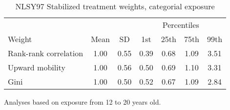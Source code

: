 \begin{table}[htp]
\centering
\footnotesize
\setlength{\tabcolsep}{10pt}
\renewcommand{\arraystretch}{1}
\begin{threeparttable}
\centering
\caption{NLSY97 Stabilized treatment weights, categorial exposure} 
\label{tab:ipt_weigths_q}
\begin{tabular}{lcccccc}
  \hline
\multicolumn{3}{c}{} & \multicolumn{4}{c}{Percentiles} \\ 
 \cmidrule{4-7} 
Weight & Mean & SD & 1st & 25th & 75th & 99th \\ 
  \hline
Rank-rank correlation & 1.00 & 0.55 & 0.39 & 0.68 & 1.09 & 3.51 \\ 
  Upward mobility & 1.00 & 0.56 & 0.50 & 0.69 & 1.10 & 3.31 \\ 
  Gini & 1.00 & 0.50 & 0.52 & 0.67 & 1.09 & 2.84 \\ 
   \hline
\end{tabular}
\begin{tablenotes}
\footnotesize
\item Analyses based on exposure from 12 to 20 years old. 
\end{tablenotes}
\end{threeparttable}
\end{table}
